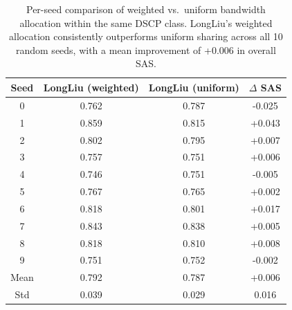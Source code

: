 \begin{table}[t]
\centering
\caption{Per-seed comparison of weighted vs.\ uniform bandwidth allocation within the same DSCP class. LongLiu's weighted allocation consistently outperforms uniform sharing across all 10 random seeds, with a mean improvement of +0.006 in overall SAS.}
\label{tab:ablation-weighted}
\begin{tabular}{cccc}
\toprule
Seed & LongLiu (weighted) & LongLiu (uniform) & $\Delta$ SAS \\
\midrule
0 & 0.762 & 0.787 & -0.025 \\
1 & 0.859 & 0.815 & +0.043 \\
2 & 0.802 & 0.795 & +0.007 \\
3 & 0.757 & 0.751 & +0.006 \\
4 & 0.746 & 0.751 & -0.005 \\
5 & 0.767 & 0.765 & +0.002 \\
6 & 0.818 & 0.801 & +0.017 \\
7 & 0.843 & 0.838 & +0.005 \\
8 & 0.818 & 0.810 & +0.008 \\
9 & 0.751 & 0.752 & -0.002 \\
\midrule
Mean & 0.792 & 0.787 & +0.006 \\
Std & 0.039 & 0.029 & 0.016 \\
\bottomrule
\end{tabular}
\end{table}